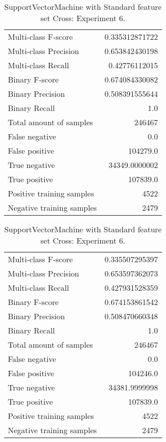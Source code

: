 \begin{table}[H]
\begin{minipage}{0.5\textwidth}
\caption{SupportVectorMachine with Standard feature set Cross: Experiment 5.}
\centering
\begin{tabular}{l r}
\toprule
Multi-class F-score & 0.335312871722 \\
Multi-class Precision & 0.653842430198 \\
Multi-class Recall & 0.42776112015 \\
\midrule
Binary F-score & 0.674084330082 \\
Binary Precision & 0.508391555644 \\
Binary Recall & 1.0 \\
\midrule
Total amount of samples & 246467 \\
False negative & 0.0 \\
False positive & 104279.0 \\
True negative & 34349.0000002 \\
True positive & 107839.0 \\
\midrule
Positive training samples & 4522 \\
Negative training samples & 2479 \\
\bottomrule
\end{tabular}
\end{minipage}
\hfillx
\begin{minipage}{0.5\textwidth}
\caption{SupportVectorMachine with Standard feature set Cross: Experiment 6.}
\centering
\begin{tabular}{l r}
\toprule
Multi-class F-score & 0.335507295397 \\
Multi-class Precision & 0.653597362073 \\
Multi-class Recall & 0.427931528359 \\
\midrule
Binary F-score & 0.674153861542 \\
Binary Precision & 0.508470660348 \\
Binary Recall & 1.0 \\
\midrule
Total amount of samples & 246467 \\
False negative & 0.0 \\
False positive & 104246.0 \\
True negative & 34381.9999998 \\
True positive & 107839.0 \\
\midrule
Positive training samples & 4522 \\
Negative training samples & 2479 \\
\bottomrule
\end{tabular}
\end{minipage}
\end{table}
